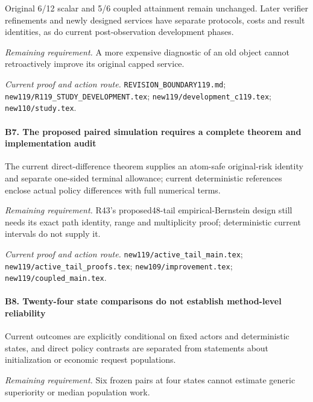 Original 6/12 scalar and 5/6 coupled attainment remain unchanged. Later verifier refinements and newly designed services have separate protocols, costs and result identities, as do current post-observation development phases.

\par\emph{Remaining requirement.} A more expensive diagnostic of an old object cannot retroactively improve its original capped service.

\par\emph{Current proof and action route.} \nolinkurl{REVISION_BOUNDARY119.md}; \nolinkurl{new119/R119_STUDY_DEVELOPMENT.tex}; \nolinkurl{new119/development_c119.tex}; \nolinkurl{new110/study.tex}.

\paragraph{B7. The proposed paired simulation requires a complete theorem and implementation audit}

The current direct-difference theorem supplies an atom-safe original-risk identity and separate one-sided terminal allowance; current deterministic references enclose actual policy differences with full numerical terms.

\par\emph{Remaining requirement.} R43's proposed48-tail empirical-Bernstein design still needs its exact path identity, range and multiplicity proof; deterministic current intervals do not supply it.

\par\emph{Current proof and action route.} \nolinkurl{new119/active_tail_main.tex}; \nolinkurl{new119/active_tail_proofs.tex}; \nolinkurl{new109/improvement.tex}; \nolinkurl{new119/coupled_main.tex}.

\paragraph{B8. Twenty-four state comparisons do not establish method-level reliability}

Current outcomes are explicitly conditional on fixed actors and deterministic states, and direct policy contrasts are separated from statements about initialization or economic request populations.

\par\emph{Remaining requirement.} Six frozen pairs at four states cannot estimate generic superiority or median population work.

